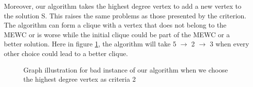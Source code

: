Moreover, our algorithm takes the highest degree vertex to add a new vertex to the solution S. This raises the same problems as those presented by the criterion. The algorithm can form a clique with a vertex that does not belong to the MEWC or is worse while the initial clique could be part of the MEWC or a better solution. Here in figure \ref{fig:bad-instance-vertex-highest-degree2}, the algorithm will take 5 $\rightarrow$ 2 $\rightarrow$ 3 when every other choice could lead to a better clique. 

\begin{center}
    \begin{figure}[H]
        \centering
        \caption{Graph illustration for bad instance of our algorithm when we choose the highest degree vertex as criteria 2}
        \label{fig:bad-instance-vertex-highest-degree2}
    \end{figure}
\end{center}